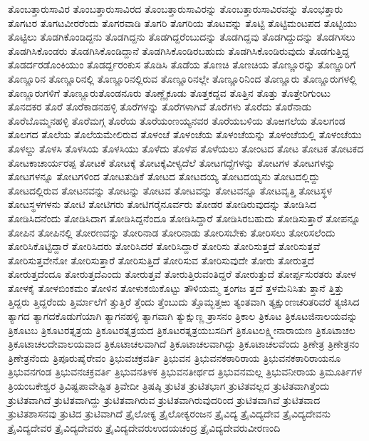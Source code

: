 {ತೊಂಬತ್ತಾರುಸಾವಿರ
ತೊಂಬತ್ತಾರುಸಾವಿರದ
ತೊಂಬತ್ತಾರುಸಾವಿರನ್ನು
ತೊಂಬತ್ತಾರುಸಾವಿರವನ್ನು
ತೊಂಭತ್ತಾರು
ತೊಗಟರ
ತೊಗಟವೀರರೆಂದು
ತೊಗರವಾಡಿ
ತೊಗರಿ
ತೊಗರಿಯ
ತೊಟವನ್ನು
ತೊಟ್ಟಿ
ತೊಟ್ಟಿಮಂಟಪದ
ತೊಟ್ಟಿಯು
ತೊಟ್ಟಿಲು
ತೊಡಗಿಕೊಂಡಿದ್ದನು
ತೊಡಗಿದ್ದನು
ತೊಡಗಿದ್ದರೆಂಬುದನ್ನು
ತೊಡಗಿದ್ದವು
ತೊಡಗಿದ್ದುದನ್ನು
ತೊಡಗಿಸಲು
ತೊಡಗಿಸಿಕೊಂಡರು
ತೊಡಗಿಸಿಕೊಂಡಿದ್ದಾನೆ
ತೊಡಗಿಸಿಕೊಂಡಿರಬಹುದು
ತೊಡಗಿಸಿಕೊಂಡಿರುವುದು
ತೊಡಗುತ್ತಿದ್ದ
ತೊಡರ್ದರಡೊಂಕಿಯುಂ
ತೊಡರ್ದ್ದರಂಕುಸ
ತೊಡಿಸಿ
ತೊಡೆಯ
ತೊಣಚಿ
ತೊಣಚಿಯ
ತೊಣ್ಣೂರನ್ನು
ತೊಣ್ಣೂರಿಗೆ
ತೊಣ್ಣೂರಿನ
ತೊಣ್ಣೂರಿನಲ್ಲಿ
ತೊಣ್ಣೂರಿನಲ್ಲಿರುವ
ತೊಣ್ಣೂರಿನಲ್ಲೇ
ತೊಣ್ಣೂರಿನಿಂದ
ತೊಣ್ಣೂರು
ತೊಣ್ಣೂರುಗಳಲ್ಲಿ
ತೊಣ್ಣೂರುಗಳಿಗೆ
ತೊಣ್ಣೂರುತೊಂಡನೂರು
ತೊಣ್ಣೈಕೂಡು
ತೊತ್ತಕದ್ದವ
ತೊತ್ತಿನ
ತೊತ್ತು
ತೊತ್ತೇರಿಗುಂಟು
ತೊನದಕರ
ತೊರೆ
ತೊರೆಕಾಡನಹಳ್ಳಿ
ತೊರೆಗಳನ್ನು
ತೊರೆಗಳಾಗಿವೆ
ತೊರೆಗಳು
ತೊರೆದು
ತೊರೆನಾಡು
ತೊರೆಬೊಮ್ಮನಹಳ್ಳಿ
ತೊರೆಮಗ್ಗ
ತೊರೆಯ
ತೊರೆಯಂಣಯ್ಯನವರ
ತೊರೆಯಬಳಿಯ
ತೊಱಗಲೆಯ
ತೊಲಗಂಡ
ತೊಲಗದ
ತೊಲೆಯ
ತೊಲೆಯಮೇಲಿರುವ
ತೊಳಂಚೆ
ತೊಳಂಚೆಯ
ತೊಳಂಚೆಯನ್ನು
ತೊಳಂಚೆಯಲ್ಲಿ
ತೊಳಂಚೆಯು
ತೊಳಲ್ದು
ತೊಳಸಿ
ತೊಳಸಿಯ
ತೊಳಸಿಯು
ತೊಳೆದು
ತೊಳೆಪ
ತೊಳೆಯಲು
ತೋಂಟದ
ತೋಟ
ತೋಟಕ
ತೋಟಕದ
ತೋಟಕಾಚಾರ್ಯರಪ್ಪ
ತೋಟಕೆ
ತೋಟಕ್ಕೆ
ತೋಟಕ್ಕೆವೀಳ್ಯದೆಲೆ
ತೋಟಗದ್ದೆಗಳನ್ನು
ತೋಟಗಳ
ತೋಟಗಳನ್ನು
ತೋಟಗಳನ್ನೂ
ತೋಟಗಳಿಂದ
ತೋಟತುಡಿಕೆ
ತೋಟದ
ತೋಟದಯ್ಯ
ತೋಟದಯ್ಯನು
ತೋಟದಲ್ಲಿದ್ದು
ತೋಟದಲ್ಲಿರುವ
ತೋಟನವನ್ನು
ತೋಟನ್ನು
ತೋಟವ
ತೋಟವನ್ನು
ತೋಟವನ್ನೂ
ತೋಟವೃತ್ತಿ
ತೋಟಸ್ಥಳ
ತೋಟಸ್ಥಳಗಳನು
ತೋಟಿ
ತೋಟಿಗರು
ತೋಟಿಗರೈನೂರ್ವರು
ತೋಡರ
ತೋಡಿರುವುದನ್ನು
ತೋಡಿಸಿದ
ತೋಡಿಸಿದನೆಂದು
ತೋಡಿಸಿದಾಗ
ತೋಡಿಸಿದ್ದನೆಂದೂ
ತೋಡಿಸಿದ್ದಾರೆ
ತೋಡಿಸಿರಬಹುದು
ತೋಡಿಸುತ್ತಾರೆ
ತೋಪನ್ನೂ
ತೋಪಿನ
ತೋಪಿನಲ್ಲಿ
ತೋರಣವನ್ನು
ತೋರಿನಾಡ
ತೋರಿನಾಡು
ತೋರಿಸಬೇಕು
ತೋರಿಸಲು
ತೋರಿಸಲೆಂದು
ತೋರಿಸಿಕೊಟ್ಟಿದ್ದಾರೆ
ತೋರಿಸಿದರು
ತೋರಿಸಿದರೆ
ತೋರಿಸಿದ್ದಾರೆ
ತೋರಿಸು
ತೋರಿಸುತ್ತದೆ
ತೋರಿಸುತ್ತವೆ
ತೋರಿಸುತ್ತವೇನೋ
ತೋರಿಸುತ್ತಾರೆ
ತೋರಿಸುತ್ತಿದೆ
ತೋರಿಸುವ
ತೋರಿಸುವುದೇ
ತೋರು
ತೋರುತ್ತದೆ
ತೋರುತ್ತದೆಂದೂ
ತೋರುತ್ತದೆಎಂದು
ತೋರುತ್ತವೆ
ತೋರುತ್ತಿರುವಂತಿದ್ದರೆ
ತೋರುತ್ತುದೆ
ತೋರ್ಪ್ಪಸುರತರು
ತೋಳ
ತೋಳಕೈ
ತೋಳಬಿಂಕಮಂ
ತೋಳಿನ
ತೋಳುಕಯಿಕೊಟ್ಟು
ತೌಳಿಯಮ್ಮ
ತ್ತಂಗಜ
ತ್ತದೆ
ತ್ತಳಮೆನಿಸಿತು
ತ್ತಾನೆ
ತ್ತಿತ್ತು
ತ್ತಿದ್ದರು
ತ್ತಿದ್ದರೆಂದು
ತ್ತಿರ್ಮಾಲೆಗೆ
ತ್ತುತ್ತಿರೆ
ತ್ತೆಂದು
ತ್ತೆಂಬುದು
ತ್ತೊಮ್ಭತ್ತಱು
ತ್ಯಂತವಾಗಿ
ತ್ಯಕ್ಷುಂಣಚರಿತರಿವರೆ
ತ್ಯಜಿಸಿದ
ತ್ಯಾಗದ
ತ್ಯಾಗದಕೊಡುಗೆಯಾಗಿ
ತ್ಯಾಗನಹಳ್ಳಿ
ತ್ಯಾಗವಾಗಿ
ತ್ಯುಕ್ಷುಣ್ಣ
ತ್ರಾಸನಂ
ತ್ರಿಕಾಲ
ತ್ರಿಕೂಟ
ತ್ರಿಕೂಟಜಿನಾಲಯವನ್ನು
ತ್ರಿಕೂಟಬ
ತ್ರಿಕೂಟರತ್ನತ್ರಯ
ತ್ರಿಕೂಟರತ್ನತ್ರಯದ
ತ್ರಿಕೂಟರತ್ನತ್ರಯಬಸದಿಗೆ
ತ್ರಿಕೂಟಲಕ್ಷ್ಮೀನಾರಾಯಣ
ತ್ರಿಕೂಟಾಚಲ
ತ್ರಿಕೂಟಾಚಲದೇವಾಲಯವಾದ
ತ್ರಿಕೂಟಾಚಲವಾಗಿದೆ
ತ್ರಿಕೂಟಾಚಲವಾಗಿದ್ದು
ತ್ರಿಕೂಟಾಚಲವೆಂದು
ತ್ರಿಣೇತ್ರ
ತ್ರಿಣೇತ್ರನಂ
ತ್ರಿಣೇತ್ರನೆಂದು
ತ್ರಿಪೂರುಷೈರೇವಂ
ತ್ರಿಭುವಚಕ್ರವರ್ತಿ
ತ್ರಿಭುವನ
ತ್ರಿಭುವನಕಠಾರಿರಾಯ
ತ್ರಿಭುವನಕಠಾರಿರಾಯನೂ
ತ್ರಿಭುವನಗಂಡ
ತ್ರಿಭುವನಚಕ್ರವರ್ತಿ
ತ್ರಿಭುವನತಿಳಕ
ತ್ರಿಭುವನತೀರ್ಥದ
ತ್ರಿಭುವನಮಲ್ಲ
ತ್ರಿಭುವನೀರಾಯ
ತ್ರಿಮೂರ್ತಿಗಳ
ತ್ರಿಯಂಬಕೇಶ್ವರ
ತ್ರಿವಿಷ್ಟಪಾವೇಷ್ಟಿತ
ತ್ರಿವೇದೀ
ತ್ರಿಷಷ್ಠಿ
ತ್ರುಟಿತ
ತ್ರುಟಿತಭಾಗ
ತ್ರುಟಿತವಲ್ಲದ
ತ್ರುಟಿತವಾಗಿತ್ತೆಂದು
ತ್ರುಟಿತವಾಗಿದೆ
ತ್ರುಟಿತವಾಗಿದ್ದು
ತ್ರುಟಿತವಾಗಿರುವ
ತ್ರುಟಿತವಾಗಿರುವುದರಿಂದ
ತ್ರುಟಿತವಾಗಿವೆ
ತ್ರುಟಿತವಾದ
ತ್ರುಟಿತಶಾಸನವು
ತ್ರುಟಿದ
ತ್ರುಟಿವಾಗಿದೆ
ತ್ರೈಲೋಕ್ಯ
ತ್ರೈಲೋಕ್ಯರಂಜನ
ತ್ರೈವಿದ್ಯ
ತ್ರೈವಿದ್ಯದೇವ
ತ್ರೈವಿದ್ಯದೇವನು
ತ್ರೈವಿದ್ಯದೇವರ
ತ್ರೈವಿದ್ಯದೇವರು
ತ್ರೈವಿದ್ಯದೇವರುಉದಯಚಂದ್ರ
ತ್ರೈವಿದ್ಯದೇವರುವೀರಣಂದಿ
}
